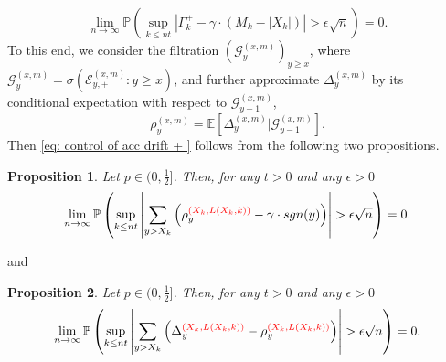 \documentclass[twoside,12pt,a4paper]{article}
\newtheorem{proposition}{Proposition}[section]
\numberwithin{equation}{section}
\newcommand{\abs}[1]{\left\vert #1 \right\vert}
\newcommand{\edt}[1]{\textcolor{red}{#1}} %
\begin{document}
	\begin{equation}\label{eq: control of acc drift + }
		\lim_{n \to \infty }\mathbb{P}\left(\sup_{k\leq nt} \abs{\Gamma^+_k - \gamma \cdot \left(M_k - \abs{X_k} \right)   } > \epsilon \sqrt{n}  \right) =0. 
	\end{equation}
	To this end, we consider the filtration $\left(\mathcal{G}_{y}^{(x,m)}\right)_{y\geq x}$, where $ \mathcal{G}_{y}^{(x,m)} = \sigma\left( \mathcal{E}^{(x,m)}_{y,+} : y \geq x \right)$, and further approximate $\Delta_y^{(x,m)}$ by its conditional expectation with respect to $\mathcal{G}_{y-1}^{(x,m)}$,
	\begin{equation}\label{eq: conditional mean}
		\rho_{y}^{(x,m)}= \mathbb{E}\left[\Delta_y^{(x,m)} | \mathcal{G}_{y-1}^{(x,m)}\right].
	\end{equation}
	Then \eqref{eq: control of acc drift + } follows from the following two propositions.
	\begin{proposition}\label{lm: approximation of means of local drift}
		Let $p\in (0,\frac{1}{2}]$. Then, for any $t>0$ and any $\epsilon >0$
		\begin{equation}\label{eq: control of expected local drift}
			\lim_{n \to \infty }\mathbb{P}\left(\sup_{k\leq nt} \abs{\sum_{y> X_k} \left( \rho_{y}^{\edt{(X_k,L(X_k,k))}} - \gamma  \cdot sgn(y) \right)   }  > \epsilon \sqrt{n}  \right) =0. 
		\end{equation}
	\end{proposition}
	and
	\begin{proposition}\label{lm: approx local drift by conditional means}
		Let $p\in (0,\frac{1}{2}]$. Then, for any $t>0$ and any $\epsilon >0$
		\begin{equation}\label{eq: control of martingale difference for local drift}
			\lim_{n \to \infty }\mathbb{P}\left(\sup_{k\leq nt} \abs{\sum_{y> X_k} \left(\Delta_{y}^{\edt{(X_k,L(X_k,k))}}- \rho_{y}^{\edt{(X_k,L(X_k,k))}} \right)   }  > \epsilon \sqrt{n}  \right) =0. 
		\end{equation}
	\end{proposition}

	
\end{document}
